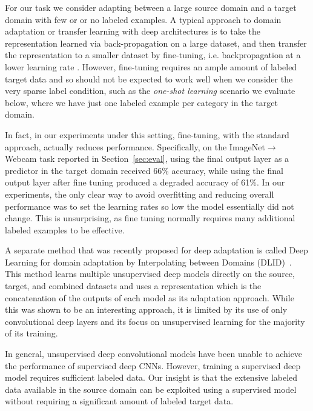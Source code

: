 \label{sec:decaf}
For our task we consider adapting between a large source domain and a target domain with few or or no labeled examples. 
A typical approach to domain adaptation or transfer learning with deep architectures is to take the representation learned via back-propagation on a large dataset, and then transfer the representation to a smaller dataset by fine-tuning, i.e. backpropagation at a lower learning rate \cite{rcnn,zeiler-arxiv-2013}.
However, fine-tuning requires an ample amount of labeled target data and so should not be expected to work well when we consider the very sparse label condition, such as the \textit{one-shot learning} scenario we evaluate below, where we have just one labeled example per category in the target domain.

In fact, in our experiments under this setting, fine-tuning, with the standard approach, actually reduces performance.
Specifically, on the ImageNet$\rightarrow$Webcam task reported in Section~\ref{sec:eval}, using the final output layer as a predictor in the target domain received 66\% accuracy, while using the final output layer after fine tuning produced a degraded accuracy of 61\%. In our experiments, the only clear way to avoid overfitting and reducing overall performance was to set the learning rates so low the model essentially did not change. This is unsurprising, as fine tuning normally requires many additional labeled examples to be effective. 

A separate method that was recently proposed for deep adaptation is called Deep Learning for domain adaptation by Interpolating between Domains (DLID)~\cite{ref:dlid}. This method learns multiple unsupervised deep models directly on the source, target, and combined datasets and uses a representation which is the concatenation of the outputs of each model as its adaptation approach. 
While this was shown to be an interesting approach, it is limited by its use of only convolutional deep layers and its focus on unsupervised learning for the majority of its training.

In general, unsupervised deep convolutional models have been unable to achieve the performance of supervised deep CNNs. However, training a supervised deep model requires sufficient labeled data. Our insight is that the extensive labeled data available in the source domain can be exploited using a supervised model without requiring a significant amount of labeled target data.

